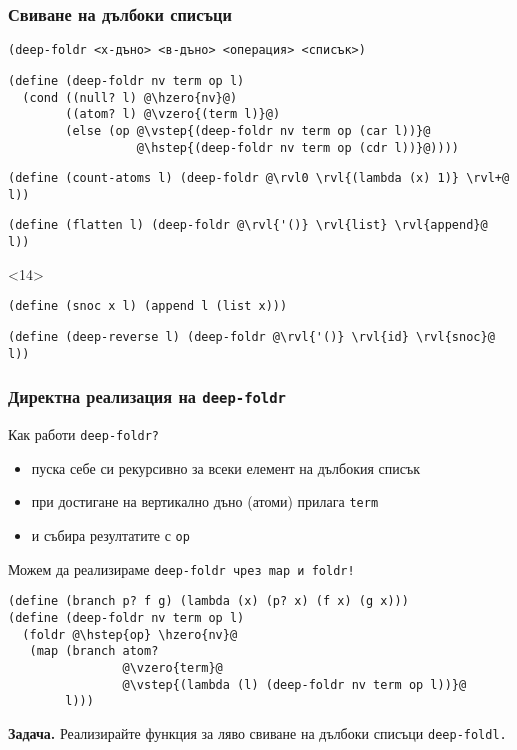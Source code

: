 \documentclass[alsotrans]{beamerswitch}
\newcommand{\hzero}{\textcolor{red}}
\newcommand{\vzero}{\textcolor{orange}}
\newcommand{\hstep}{\textcolor{green}}
\newcommand{\vstep}{\textcolor{cyan}}
\begin{document}
\begin{frame}[fragile]
  \frametitle{Свиване на дълбоки списъци}

  \tt{(deep-foldr }<х-дъно> <в-дъно> <операция> <списък>\tt)\\
  \pause
  \onslide<+->
\begin{lstlisting}
(define (deep-foldr nv term op l)
  (cond ((null? l) @\hzero{nv}@)
        ((atom? l) @\vzero{(term l)}@)
        (else (op @\vstep{(deep-foldr nv term op (car l))}@
                  @\hstep{(deep-foldr nv term op (cdr l))}@))))
\end{lstlisting}
  \onslide<+->
\begin{lstlisting}
(define (count-atoms l) (deep-foldr @\rvl0 \rvl{(lambda (x) 1)} \rvl+@ l))
\end{lstlisting}
  \onslide<+->
\begin{lstlisting}
(define (flatten l) (deep-foldr @\rvl{'()} \rvl{list} \rvl{append}@ l))
\end{lstlisting}
  \onslide<+->
  \begin{visibleenv}<14>
\begin{lstlisting}
(define (snoc x l) (append l (list x)))\end{lstlisting}%
  \end{visibleenv}%
\begin{lstlisting}
(define (deep-reverse l) (deep-foldr @\rvl{'()} \rvl{id} \rvl{snoc}@ l))
\end{lstlisting}
\end{frame}

\begin{frame}[fragile]
  \frametitle{Директна реализация на \tt{deep-foldr}}

  Как работи \tt{deep-foldr}?
  \pause
  \begin{itemize}[<+->]
  \item пуска себе си рекурсивно за всеки елемент на дълбокия списък
  \item при достигане на вертикално дъно (атоми) прилага \tt{term}
  \item и събира резултатите с \tt{op}
  \end{itemize}
  \onslide<+->
  Можем да реализираме \tt{deep-foldr} чрез \tt{map} и \tt{foldr}!
  \onslide<+->
\begin{lstlisting}
(define (branch p? f g) (lambda (x) (p? x) (f x) (g x)))
(define (deep-foldr nv term op l)
  (foldr @\hstep{op} \hzero{nv}@
   (map (branch atom?
                @\vzero{term}@
                @\vstep{(lambda (l) (deep-foldr nv term op l))}@
        l)))
\end{lstlisting}
  \onslide<+->
 \textbf{Задача.} Реализирайте функция за ляво свиване на дълбоки списъци \tt{deep-foldl}.
\end{frame}
\end{document}

